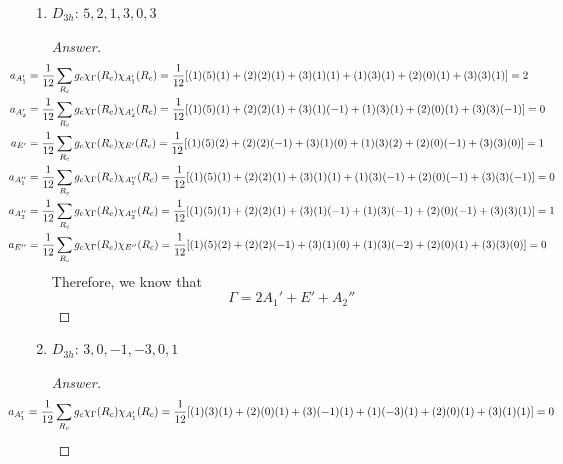 \documentclass[../psets.tex]{subfiles}
\begin{document}
\begin{enumerate}[label={\Roman*)}]
    \begin{enumerate}[label={\alph*)}]
        \item $D_{3h}$: $5,2,1,3,0,3$
        \begin{proof}[Answer]
            \begin{align*}
                \hspace{-4em}a_{A_1'}  &= \frac{1}{12}\sum_{R_c}g_c\chi_\Gamma(R_c)\chi_{A_1'}(R_c)  = \frac{1}{12}[(1)(5)(1)+(2)(2)(1)+(3)(1)(1)+(1)(3)(1)+(2)(0)(1)+(3)(3)(1)] = 2\\
                \hspace{-4em}a_{A_2'}  &= \frac{1}{12}\sum_{R_c}g_c\chi_\Gamma(R_c)\chi_{A_2'}(R_c)  = \frac{1}{12}[(1)(5)(1)+(2)(2)(1)+(3)(1)(-1)+(1)(3)(1)+(2)(0)(1)+(3)(3)(-1)] = 0\\
                \hspace{-4em}a_{E'}    &= \frac{1}{12}\sum_{R_c}g_c\chi_\Gamma(R_c)\chi_{E'}(R_c)    = \frac{1}{12}[(1)(5)(2)+(2)(2)(-1)+(3)(1)(0)+(1)(3)(2)+(2)(0)(-1)+(3)(3)(0)] = 1\\
                \hspace{-4em}a_{A_1''} &= \frac{1}{12}\sum_{R_c}g_c\chi_\Gamma(R_c)\chi_{A_1''}(R_c) = \frac{1}{12}[(1)(5)(1)+(2)(2)(1)+(3)(1)(1)+(1)(3)(-1)+(2)(0)(-1)+(3)(3)(-1)] = 0\\
                \hspace{-4em}a_{A_2''} &= \frac{1}{12}\sum_{R_c}g_c\chi_\Gamma(R_c)\chi_{A_2''}(R_c) = \frac{1}{12}[(1)(5)(1)+(2)(2)(1)+(3)(1)(-1)+(1)(3)(-1)+(2)(0)(-1)+(3)(3)(1)] = 1\\
                \hspace{-4em}a_{E''}   &= \frac{1}{12}\sum_{R_c}g_c\chi_\Gamma(R_c)\chi_{E''}(R_c)   = \frac{1}{12}[(1)(5)(2)+(2)(2)(-1)+(3)(1)(0)+(1)(3)(-2)+(2)(0)(1)+(3)(3)(0)] = 0
            \end{align*}
            Therefore, we know that
            \begin{equation*}
                \Gamma = 2A_1'+E'+A_2''
            \end{equation*}
        \end{proof}
        \item $D_{3h}$: $3,0,-1,-3,0,1$
        \begin{proof}[Answer]
            \begin{align*}
                \hspace{-4em}a_{A_1'}  &= \frac{1}{12}\sum_{R_c}g_c\chi_\Gamma(R_c)\chi_{A_1'}(R_c)  = \frac{1}{12}[(1)(3)(1)+(2)(0)(1)+(3)(-1)(1)+(1)(-3)(1)+(2)(0)(1)+(3)(1)(1)] = 0\\

\end{align*}
\end{proof}
\end{enumerate}
\end{enumerate}
\end{document}
